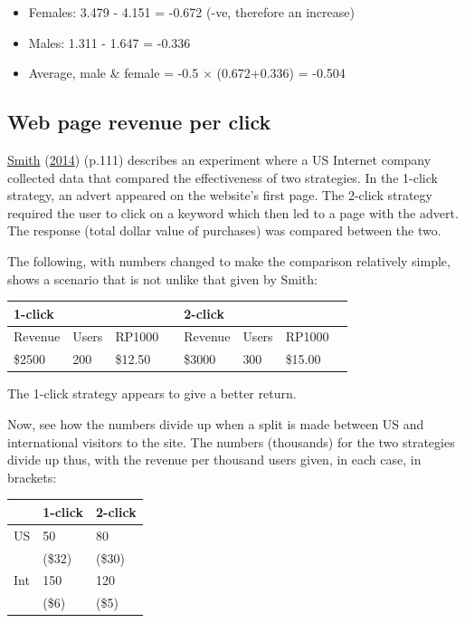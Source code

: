 \documentclass[
  10pt,
  b5paper]{book}
\providecommand{\tightlist}{%
  \setlength{\itemsep}{0pt}\setlength{\parskip}{0pt}}
\begin{document}
\begin{itemize}
\tightlist
\item
  Females: 3.479 - 4.151 = -0.672 (-ve, therefore an increase)
\item
  Males: 1.311 - 1.647 = -0.336
\item
  Average, male \& female = -0.5 \(\times\) (0.672+0.336) = -0.504
\end{itemize}

\hypertarget{web-page-revenue-per-click}{%
\subsection*{Web page revenue per click}\label{web-page-revenue-per-click}}

\protect\hyperlink{ref-smith-sd}{Smith} (\protect\hyperlink{ref-smith-sd}{2014}) (p.111) describes an experiment where a US Internet company
collected data that compared the effectiveness of two strategies.
In the 1-click strategy, an advert appeared on the website's first page.
The 2-click strategy required the user to click on a keyword which
then led to a page with the advert. The response (total dollar value
of purchases) was compared between the two.

The following, with numbers changed to make the comparison relatively
simple, shows a scenario that is not unlike that given by Smith:

\begin{longtable}[]{@{}llllllll@{}}
\toprule
1-click & & & & 2-click & & & \\
\midrule
\endhead
Revenue & Users & RP1000 & & Revenue & Users & RP1000 & \\
\$2500 & 200 & \$12.50 & & \$3000 & 300 & \$15.00 & \\
\bottomrule
\end{longtable}

The 1-click strategy appears to give a better return.

Now, see how the numbers divide up when a split is made between
US and international visitors to the site.
The numbers (thousands) for the two strategies divide up thus,
with the revenue per thousand users given, in each case, in brackets:

\begin{longtable}[]{@{}lll@{}}
\toprule
& 1-click & 2-click \\
\midrule
\endhead
US & 50 & 80 \\
& (\$32) & (\$30) \\
Int & 150 & 120 \\
& (\$6) & (\$5) \\
\bottomrule
\end{longtable}
\end{document}
